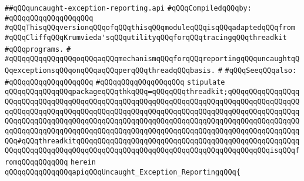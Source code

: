\label{src/lib/src/lib/thread-kit/src/lib/uncaught-exception-reporting.api}
\verb|##qQQquncaught-exception-reporting.api|\newline
\newline
\verb|#qQQqCompiledqQQqby:|\newline
\verb|#qQQqqQQqqQQqqQQqqQQq|\newline
\newline
\newline
\newline
\verb|#qQQqThisqQQqversionqQQqofqQQqthisqQQqmoduleqQQqisqQQqadaptedqQQqfrom|\newline
\verb|#qQQqCliffqQQqKrumvieda'sqQQqutilityqQQqforqQQqtracingqQQqthreadkit|\newline
\verb|#qQQqprograms.|\newline
\verb|#|\newline
\verb|#qQQqqQQqqQQqqQQqoqQQqaqQQqmechanismqQQqforqQQqreportingqQQquncaughtqQQqexceptionsqQQqonqQQqaqQQqperqQQqthreadqQQqbasis.|\newline
\verb|#|\newline
\verb|#qQQqSeeqQQqalso:|\newline
\verb|#qQQqqQQqqQQqqQQqqQQq|\newline
\verb|#qQQqqQQqqQQqqQQqqQQq|\newline
\newline
\verb|stipulate|\newline
\verb|qQQqqQQqqQQqqQQqpackageqQQqthkqQQq=qQQqqQQqthreadkit;qQQqqQQqqQQqqQQqqQQqqQQqqQQqqQQqqQQqqQQqqQQqqQQqqQQqqQQqqQQqqQQqqQQqqQQqqQQqqQQqqQQqqQQqqQQqqQQqqQQqqQQqqQQqqQQqqQQqqQQqqQQqqQQqqQQqqQQqqQQqqQQqqQQqqQQqqQQqqQQqqQQqqQQqqQQqqQQqqQQqqQQqqQQqqQQqqQQqqQQqqQQqqQQqqQQqqQQqqQQqqQQqqQQqqQQqqQQqqQQqqQQqqQQqqQQqqQQqqQQqqQQqqQQqqQQqqQQqqQQqqQQqqQQqqQQqqQQqqQQq#qQQqthreadkitqQQqqQQqqQQqqQQqqQQqqQQqqQQqqQQqqQQqqQQqqQQqqQQqqQQqqQQqqQQqqQQqqQQqqQQqqQQqqQQqqQQqqQQqqQQqqQQqqQQqqQQqqQQqqQQqqQQqisqQQqfromqQQqqQQqqQQq|\newline
\verb|herein|\newline
\newline
\verb|qQQqqQQqqQQqqQQqapiqQQqUncaught_Exception_ReportingqQQq{|\newline

